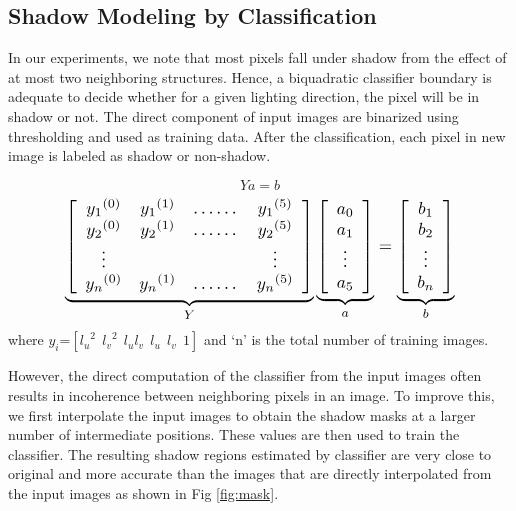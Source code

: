 \subsection{Shadow Modeling by Classification}

In our experiments, we note that most pixels fall under shadow from the effect
of at most two neighboring structures. Hence, a biquadratic classifier boundary
is adequate to decide whether for a given lighting direction, the pixel will be
in shadow or not. The direct component of input images are binarized using
thresholding and used as training data. After the classification, each pixel in
new image is labeled as shadow or non-shadow.

\begin{equation}
 Ya=b
\end{equation}
\begin{equation}
\resizebox{.81\hsize}{!}{$
\underbrace{\left[ {\begin{array}{cccccc}
 {y_1}^{(0)} & {y_1}^{(1)} & \dots\dots & {y_1}^{(5)}\\
{y_2}^{(0)} & {y_2}^{(1)} & \dots\dots & {y_2}^{(5)} \\
 \vdots &  &  & \vdots \\
{y_n}^{(0)} & {y_n}^{(1)} & \dots\dots & {y_n}^{(5)}
 \end{array} } \right]}_{Y}
\underbrace{\left[ {\begin{array}{c}
a_0\\a_1\\ \vdots \\a_5
 \end{array} } \right]}_{a}
=
\underbrace{\left[ {\begin{array}{c}
b_1\\b_2\\ \vdots \\b_n
 \end{array} } \right]}_{b}$}
\end{equation}where
$y_i$=$[{l_u}^2\ \ {l_v}^2\ \ l_ul_v\ \ l_u\ \ l_v\ \ 1]$ and `n' is the total
number of training images.


However, the direct computation of the classifier from the input images often
results in incoherence between neighboring pixels in an image. To improve this,
we first interpolate the input images to obtain the shadow masks at a larger
number of intermediate positions. These values are then used to train the
classifier. The resulting shadow regions estimated by classifier are very close
to original and more accurate than the images that are directly interpolated
from the input images as shown in Fig \ref{fig:mask}.

